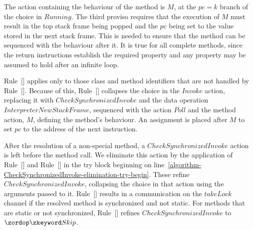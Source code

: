 The action containing the behaviour of the method is $M$, at the
$pc = k$ branch of the choice in $Running$.
The third proviso requires that the execution of $M$ must result in
the top stack frame being popped and the $pc$ being set to the value
stored in the next stack frame.
This is needed to ensure that the method can be sequenced with the
behaviour after it.
It is true for all complete methods, since the return instructions
establish the required property and any property may be assumed to
hold after an infinite loop.

Rule~[] applies only to those
class and method identifiers that are not handled by
Rule~[].
Because of this, Rule~[] collapses
the choice in the $Invoke$ action, replacing it with
$CheckSynchronizedInvoke$ and the data operation
$InterpreterNewStackFrame$, sequenced with the action $Poll$ and the
method action, $M$, defining the method's behaviour.
An assignment is placed after $M$ to set $pc$ to the address of the
next instruction.

After the resolution of a non-special method, a
$CheckSynchronizedInvoke$ action is left before the method call.
We eliminate this action by the application of
Rule~[]
and
Rule~[]
in the try block beginning on
line~\ref{algorithm-CheckSynchronizedInvoke-elimination-try-begin}.
These refine $CheckSynchronizedInvoke$, collapsing the choice in that
action using the arguments passed to it.
Rule~[]
results in a communication on the $takeLock$ channel if the resolved
method is synchronized and not static.
For methods that are static or not synchronized,
Rule~[]
refines $CheckSynchronizedInvoke$ to $\Skip$.

